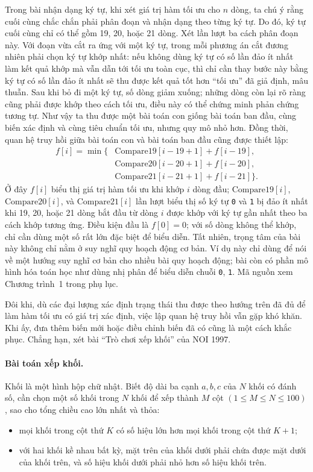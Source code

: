 \documentclass[11pt]{article}
\begin{document}
Trong bài nhận dạng ký tự, khi xét giá trị hàm tối ưu cho \(n\) dòng, ta chú
ý rằng cuối cùng chắc chắn phải phân đoạn và nhận dạng theo từng ký tự. Do đó,
ký tự cuối cùng chỉ có thể gồm 19, 20, hoặc 21 dòng. Xét lần lượt ba cách
phân đoạn này. Với đoạn vừa cắt ra ứng với một ký tự, trong mỗi phương án cắt
đương nhiên phải chọn ký tự khớp nhất: nếu không dùng ký tự có số lần đảo ít
nhất làm kết quả khớp mà vẫn dẫn tới tối ưu toàn cục, thì chỉ cần thay bước
này bằng ký tự có số lần đảo ít nhất sẽ thu được kết quả tốt hơn ``tối ưu''
đã giả định, mâu thuẫn. Sau khi bỏ đi một ký tự, số dòng giảm xuống; những
dòng còn lại rõ ràng cũng phải được khớp theo cách tối ưu, điều này có thể
chứng minh phản chứng tương tự. Như vậy ta thu được một bài toán con giống
bài toán ban đầu, cùng biến xác định và cùng tiêu chuẩn tối ưu, nhưng quy mô
nhỏ hơn. Đồng thời, quan hệ truy hồi giữa bài toán con và bài toán ban đầu
cũng được thiết lập:
\[
\begin{aligned}
  f[i]=\min\{&
  \mathrm{Compare19}[i-19+1]+f[i-19],\\
  &\mathrm{Compare20}[i-20+1]+f[i-20],\\
  &\mathrm{Compare21}[i-21+1]+f[i-21]\}.
\end{aligned}
\]
Ở đây \(f[i]\) biểu thị giá trị hàm tối ưu khi khớp \(i\) dòng đầu;
\(\mathrm{Compare19}[i]\), \(\mathrm{Compare20}[i]\), và
\(\mathrm{Compare21}[i]\) lần lượt biểu thị số ký tự \texttt{0} và \texttt{1}
bị đảo ít nhất khi 19, 20, hoặc 21 dòng bắt đầu từ dòng \(i\) được khớp với
ký tự gần nhất theo ba cách khớp tương ứng. Điều kiện đầu là \(f[0]=0\); với
số dòng không thể khớp, chỉ cần dùng một số rất lớn đặc biệt để biểu diễn.
Tất nhiên, trọng tâm của bài này không chỉ nằm ở suy nghĩ quy hoạch động cơ
bản. Ví dụ này chỉ dùng để nói về một hướng suy nghĩ cơ bản cho nhiều bài quy
hoạch động; bài còn có phần mô hình hóa toán học như dùng nhị phân để biểu
diễn chuỗi \texttt{0}, \texttt{1}. Mã nguồn xem Chương trình~1 trong phụ lục.

Đôi khi, dù các đại lượng xác định trạng thái thu được theo hướng trên đã đủ
để làm hàm tối ưu có giá trị xác định, việc lập quan hệ truy hồi vẫn gặp khó
khăn. Khi ấy, đưa thêm biến mới hoặc điều chỉnh biến đã có cũng là một cách
khắc phục. Chẳng hạn, xét bài ``Trò chơi xếp khối'' của NOI 1997.

\paragraph{Bài toán xếp khối.}
Khối là một hình hộp chữ nhật. Biết độ dài ba cạnh \(a,b,c\) của \(N\) khối có
đánh số, cần chọn một số khối trong \(N\) khối để xếp thành \(M\) cột
\((1\le M\le N\le 100)\), sao cho tổng chiều cao lớn nhất và thỏa:
\begin{itemize}
  \item mọi khối trong cột thứ \(K\) có số hiệu lớn hơn mọi khối trong cột thứ
  \(K+1\);
  \item với hai khối kề nhau bất kỳ, mặt trên của khối dưới phải chứa được mặt
  dưới của khối trên, và số hiệu khối dưới phải nhỏ hơn số hiệu khối trên.
\end{itemize}
\end{document}
